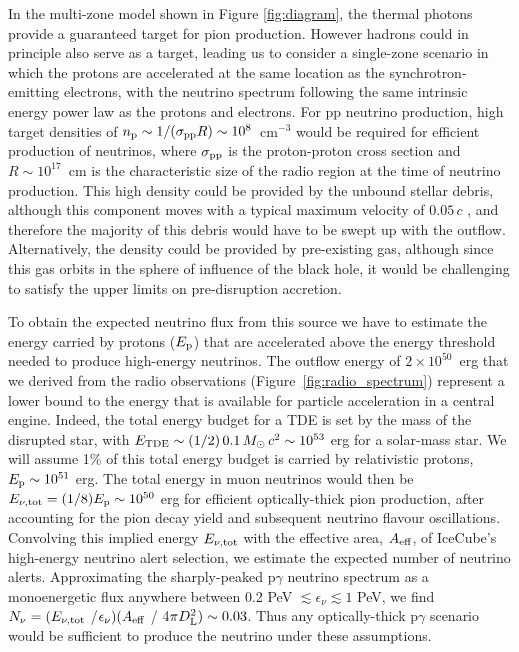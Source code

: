 \documentclass{nature_plusfigure}
\newcommand{\Msol}{\mbox{$M_{\odot}$}}
\begin{document}
In the multi-zone model shown in Figure \ref{fig:diagram}, the thermal photons provide a guaranteed target for pion production. However hadrons could in principle also serve as a target, leading us to consider a single-zone scenario in which the protons are accelerated at the same location as the synchrotron-emitting electrons, with the neutrino spectrum following the same intrinsic energy power law as the protons and electrons. For pp neutrino production, high target densities of $n_{\rm p}\sim 1/(\sigma_{\rm pp} R)\sim 10^8$~cm$^{-3}$ would be required for efficient production of neutrinos, where $\sigma_{\rm pp}$ is the proton-proton cross section and $R \sim 10^{17}$~cm is the characteristic size of the radio region at the time of neutrino production. This high density could be provided by the unbound stellar debris, although this component moves with a typical maximum velocity\cite{2016ApJ...827..127K} of $0.05\,c$ , and therefore the majority of this debris would have to be swept up with the outflow. Alternatively, the density could be provided by pre-existing gas, although since this gas orbits in the sphere of influence of the black hole, it would be challenging to satisfy the upper limits on pre-disruption accretion. 

To obtain the expected neutrino flux from this source we have to estimate the energy carried by protons ($E_{\textup{p}}$) that are accelerated above the energy threshold needed to produce high-energy neutrinos. 
The outflow energy of $2 \times 10^{50}$~erg that we derived from the radio observations (Figure~\ref{fig:radio_spectrum}) represent a lower bound to the energy that is available for particle acceleration in a central engine.  Indeed, the total energy budget for a TDE is set by the mass of the disrupted star, with $E_{\textup{TDE}} \sim (1/2)\, 0.1 \, \Msol \, c^{2} \sim 10^{53}$ erg for a solar-mass star. We will assume 1\% of this total energy budget is carried by relativistic protons, $E_{\textup{p}} \sim 10^{51}$ erg. The total energy in muon neutrinos would then be $E_{\nu, \rm tot} = (1/8) E_{\rm p} \sim 10^{50}$ erg for efficient optically-thick pion production, after accounting for the pion decay yield and subsequent neutrino flavour oscillations. Convolving this implied energy $E_{\nu, \rm tot}$ with the effective area, $A_{\rm eff}$, of IceCube's high-energy neutrino alert selection\cite{2019ICRC...36.1021B}, we estimate the expected number of neutrino alerts. Approximating the sharply-peaked p$\gamma$ neutrino spectrum as a monoenergetic flux anywhere between  0.2 PeV $\lesssim \epsilon_\nu \lesssim 1$ PeV, we find $N_\nu = (E_{\nu, \rm tot}$ /$\epsilon_\nu)(A_{\rm eff}$ / 4$\pi D_{\rm L}^{2})  \sim 0.03$. Thus any optically-thick p$\gamma$ scenario would be sufficient to produce the neutrino under these assumptions. 
\end{document}
